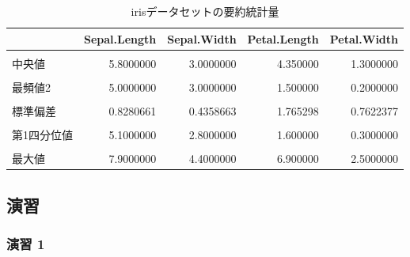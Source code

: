 \documentclass[
  12pt,
]{book}
\begin{document}
\begin{table}[H]

\caption{\label{tab:unnamed-chunk-81}irisデータセットの要約統計量}
\centering
\begin{tabular}[t]{lrrrr}
\toprule
  & Sepal.Length & Sepal.Width & Petal.Length & Petal.Width\\
\midrule
\cellcolor{gray!6}{平均} & \cellcolor{gray!6}{5.8433333} & \cellcolor{gray!6}{3.0573333} & \cellcolor{gray!6}{3.758000} & \cellcolor{gray!6}{1.1993333}\\
中央値 & 5.8000000 & 3.0000000 & 4.350000 & 1.3000000\\
\cellcolor{gray!6}{最頻値1} & \cellcolor{gray!6}{5.0000000} & \cellcolor{gray!6}{3.0000000} & \cellcolor{gray!6}{1.400000} & \cellcolor{gray!6}{0.2000000}\\
最頻値2 & 5.0000000 & 3.0000000 & 1.500000 & 0.2000000\\
\cellcolor{gray!6}{分散} & \cellcolor{gray!6}{0.6856935} & \cellcolor{gray!6}{0.1899794} & \cellcolor{gray!6}{3.116278} & \cellcolor{gray!6}{0.5810063}\\
\addlinespace
標準偏差 & 0.8280661 & 0.4358663 & 1.765298 & 0.7622377\\
\cellcolor{gray!6}{最小値} & \cellcolor{gray!6}{4.3000000} & \cellcolor{gray!6}{2.0000000} & \cellcolor{gray!6}{1.000000} & \cellcolor{gray!6}{0.1000000}\\
第1四分位値 & 5.1000000 & 2.8000000 & 1.600000 & 0.3000000\\
\cellcolor{gray!6}{第3四分位値} & \cellcolor{gray!6}{6.4000000} & \cellcolor{gray!6}{3.3000000} & \cellcolor{gray!6}{5.100000} & \cellcolor{gray!6}{1.8000000}\\
最大値 & 7.9000000 & 4.4000000 & 6.900000 & 2.5000000\\
\bottomrule
\end{tabular}
\end{table}

\newpage

\hypertarget{ux6f14ux7fd2}{%
\subsection{演習}\label{ux6f14ux7fd2}}

\hypertarget{ux6f14ux7fd2-1}{%
\subsubsection*{演習 1}\label{ux6f14ux7fd2-1}}
\end{document}
